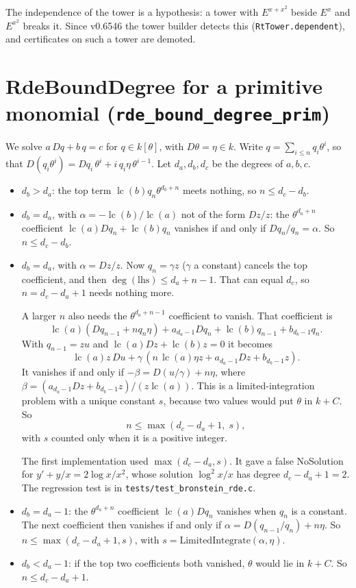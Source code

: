 \documentclass[11pt]{article}
\theoremstyle{definition}
\theoremstyle{remark}
\newcommand{\lc}{\operatorname{lc}}
\newcommand{\code}[1]{\texttt{#1}}
\begin{document}
The independence of the tower is a hypothesis: a tower with $E^{x+x^2}$ beside
$E^x$ and $E^{x^2}$ breaks it. Since v0.6546 the tower builder detects this
(\code{RtTower.dependent}), and certificates on such a tower are demoted.

\section{RdeBoundDegree for a primitive monomial (\code{rde\_bound\_degree\_prim})}
\label{sec:A2}

We solve $a\,Dq+b\,q=c$ for $q\in k[\theta]$, with $D\theta=\eta\in k$. Write
$q=\sum_{i\le n}q_i\theta^i$, so that
$D(q_i\theta^i)=Dq_i\,\theta^i+i\,q_i\eta\,\theta^{i-1}$. Let $d_a,d_b,d_c$ be
the degrees of $a,b,c$.

\begin{itemize}
\item $d_b>d_a$: the top term $\lc(b)q_n\theta^{d_b+n}$ meets nothing, so
  $n\le d_c-d_b$.
\item $d_b=d_a$, with $\alpha=-\lc(b)/\lc(a)$ not of the form $Dz/z$: the
  $\theta^{d_a+n}$ coefficient $\lc(a)Dq_n+\lc(b)q_n$ vanishes if and only if
  $Dq_n/q_n=\alpha$. So $n\le d_c-d_b$.
\item $d_b=d_a$, with $\alpha=Dz/z$. Now $q_n=\gamma z$ ($\gamma$ a constant)
  cancels the top coefficient, and then $\deg(\mathrm{lhs})\le d_a+n-1$. That
  can equal $d_c$, so $n=d_c-d_a+1$ needs nothing more.

  A larger $n$ also needs the $\theta^{d_a+n-1}$ coefficient to vanish. That
  coefficient is
  \[ \lc(a)(Dq_{n-1}+n q_n\eta)+a_{d_a-1}Dq_n+\lc(b)q_{n-1}+b_{d_b-1}q_n. \]
  With $q_{n-1}=zu$ and $\lc(a)Dz+\lc(b)z=0$ it becomes
  \[ \lc(a)z\,Du+\gamma\,(n\,\lc(a)\eta z+a_{d_a-1}Dz+b_{d_b-1}z). \]
  It vanishes if and only if $-\beta=D(u/\gamma)+n\eta$, where
  $\beta=(a_{d_a-1}Dz+b_{d_b-1}z)/(z\lc(a))$. This is a limited-integration
  problem with a unique constant $s$, because two values would put $\theta$ in
  $k+C$. So
  \[ n\le\max(d_c-d_a+1,\;s), \]
  with $s$ counted only when it is a positive integer.

  The first implementation used $\max(d_c-d_a,s)$. It gave a false NoSolution
  for $y'+y/x=2\log x/x^2$, whose solution $\log^2 x/x$ has degree
  $d_c-d_a+1=2$. The regression test is in \code{tests/test\_bronstein\_rde.c}.
\item $d_b=d_a-1$: the $\theta^{d_a+n}$ coefficient $\lc(a)Dq_n$ vanishes when
  $q_n$ is a constant. The next coefficient then vanishes if and only if
  $\alpha=D(q_{n-1}/q_n)+n\eta$. So $n\le\max(d_c-d_a+1,s)$, with
  $s=\mathrm{LimitedIntegrate}(\alpha,\eta)$.
\item $d_b<d_a-1$: if the top two coefficients both vanished, $\theta$ would
  lie in $k+C$. So $n\le d_c-d_a+1$.
\end{itemize}
\end{document}
